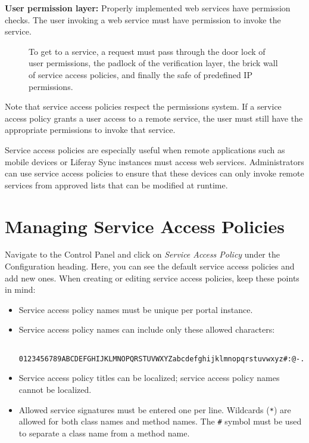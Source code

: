 \textbf{User permission layer:} Properly implemented web services have
permission checks. The user invoking a web service must have permission
to invoke the service.

\begin{figure}
\centering
{}
\caption{To get to a service, a request must pass through the door lock
of user permissions, the padlock of the verification layer, the brick
wall of service access policies, and finally the safe of predefined IP
permissions.}
\end{figure}

Note that service access policies respect the permissions system. If a
service access policy grants a user access to a remote service, the user
must still have the appropriate permissions to invoke that service.

Service access policies are especially useful when remote applications
such as mobile devices or Liferay Sync instances must access web
services. Administrators can use service access policies to ensure that
these devices can only invoke remote services from approved lists that
can be modified at runtime.

\section{Managing Service Access
Policies}\label{managing-service-access-policies}

Navigate to the Control Panel and click on \emph{Service Access Policy}
under the Configuration heading. Here, you can see the default service
access policies and add new ones. When creating or editing service
access policies, keep these points in mind:

\begin{itemize}
\item
  Service access policy names must be unique per portal instance.
\item
  Service access policy names can include only these allowed characters:

\begin{verbatim}
  0123456789ABCDEFGHIJKLMNOPQRSTUVWXYZabcdefghijklmnopqrstuvwxyz#:@-./_
\end{verbatim}
\item
  Service access policy titles can be localized; service access policy
  names cannot be localized.
\item
  Allowed service signatures must be entered one per line. Wildcards
  (\texttt{*}) are allowed for both class names and method names. The
  \texttt{\#} symbol must be used to separate a class name from a method
  name.
\end{itemize}


